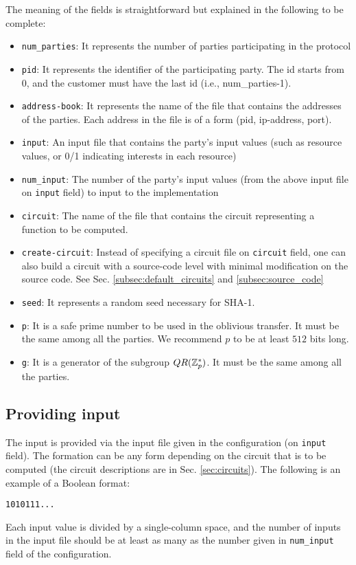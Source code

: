 \documentclass{article}
\begin{document}
The meaning of the fields is straightforward but explained in the
following to be complete:
\begin{itemize}
\item
{\tt num\_parties}:
It represents the number of parties participating in the protocol
\item
{\tt pid}:
It represents the identifier of the participating party. The id starts
from $0$, and the customer must have the last id (i.e.,
num\_parties-1).
\item
{\tt address-book}:
It represents the name of the file that contains the addresses of the
parties. Each address in the file is of a form (pid, ip-address,
port).
\item
{\tt input}:
An input file that contains the party's input values (such as resource
values, or 0/1 indicating interests in each resource)
\item
{\tt num\_input}:
The number of the party's input values (from the above input file on
{\tt input} field) to input to the implementation
\item
{\tt circuit}:
The name of the file that contains the circuit representing a function
to be computed.
\item
{\tt create-circuit}: Instead of specifying a circuit file on {\tt circuit} field,
one can also build a circuit with a source-code level with minimal modification
on the source code. See Sec. \ref{subsec:default_circuits} and \ref{subsec:source_code}
\item
{\tt seed}:
It represents a random seed necessary for SHA-1.
\item
{\tt p}:
It is a safe prime number to be used in the oblivious transfer. It must be the
same among all the parties. We recommend $p$ to be at least $512$ bits
long.
\item
{\tt g}:
It is a generator of the subgroup $QR({\mathbb Z}_p^*)$. It must be the same
among all the parties.
\end{itemize}


\subsection{Providing input}
The input is provided via the input file given in the configuration (on {\tt input} field).
The formation can be any form depending on the circuit that is to
be computed (the circuit descriptions are in Sec. \ref{sec:circuits}).
The following is an example of a Boolean format:
%
\begin{alltt}
\small
1 0 1 0 1 1 1 ...
\end{alltt}
%
Each input value is divided by a single-column space, and the number
of inputs in the input file should be at least as many as the number
given in {\tt num\_input} field of the configuration.
\end{document}
